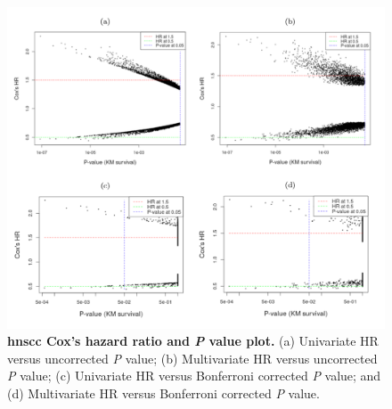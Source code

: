 \documentclass[jpm,article,submit,moreauthors,pdftex]{Definitions/mdpi}
\newcommand{\bcaption}[2]{\caption{\textbf{#1} #2}}
\begin{document}
\begin{figure}[hp]
\centering
\includegraphics[width=14cm]{Figure2.pdf}
\bcaption{\acrshort{hnscc} Cox's hazard ratio and \textit{P} value plot.}
{(a) Univariate HR versus uncorrected \textit{P} value; (b) Multivariate HR versus uncorrected \textit{P} value; (c) Univariate HR versus Bonferroni corrected \textit{P} value; and (d) Multivariate HR versus Bonferroni corrected \textit{P} value.}
\label{fig:figure2}
\end{figure}

\end{document}
